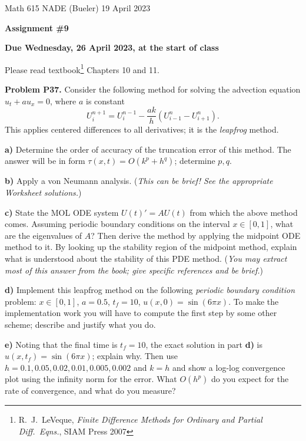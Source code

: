 \documentclass[12pt]{amsart}
\newcommand{\prob}[1]{\bigskip\noindent\textbf{#1}\quad }
\newcommand{\epart}[1]{\medskip\noindent\textbf{#1)}\quad }
\begin{document}
\scriptsize \noindent Math 615 NADE (Bueler) \hfill 19 April 2023
\normalsize

\medskip\bigskip

\Large\centerline{\textbf{Assignment \#9}}
\large
\bigskip

\centerline{\textbf{Due Wednesday, 26 April 2023, at the start of class}}
\bigskip
\normalsize

\thispagestyle{empty}

\bigskip
Please read textbook\footnote{R.~J.~LeVeque, \emph{Finite Difference Methods for Ordinary and Partial Diff.~Eqns.}, SIAM Press 2007} Chapters 10 and 11.


\medskip
\prob{Problem P37.}  Consider the following method for solving the advection equation
$u_t + a u_x = 0$, where $a$ is constant
    $$U_i^{n+1} = U_i^{n-1} - \frac{ak}{h}(U_{i-1}^n - U_{i+1}^n).$$
This applies centered differences to all derivatives; it is the \emph{leapfrog} method.

\epart{a} Determine the order of accuracy of the truncation error of this method.  The answer will be in form $\tau(x,t) = O(k^p + h^q)$; determine $p,q$.

\epart{b} Apply a von Neumann analysis.  (\emph{This can be brief!  See the appropriate Worksheet solutions.})

\epart{c} State the MOL ODE system $U(t)' = A U(t)$ from which the above method comes.  Assuming periodic boundary conditions on the interval $x\in[0,1]$, what are the eigenvalues of $A$?  Then derive the method by applying the midpoint ODE method to it.  By looking up the stability region of the midpoint method, explain what is understood about the stability of this PDE method.  (\emph{You may extract most of this answer from the book; give specific references and be brief.})

\epart{d} Implement this leapfrog method on the following \emph{periodic boundary condition} problem:  $x\in[0,1]$, $a = 0.5$, $t_f = 10$, $u(x,0)=\sin(6\pi x)$.  To make the implementation work you will have to compute the first step by some other scheme; describe and justify what you do.

\epart{e} Noting that the final time is $t_f=10$, the exact solution in part \textbf{d)} is $u(x,t_f) = \sin(6\pi x)$; explain why.  Then use $h=0.1,0.05,0.02,0.01,0.005,0.002$ and $k=h$ and show a log-log convergence plot using the infinity norm for the error.  What $O(h^p)$ do you expect for the rate of convergence, and what do you measure?
\end{document}
